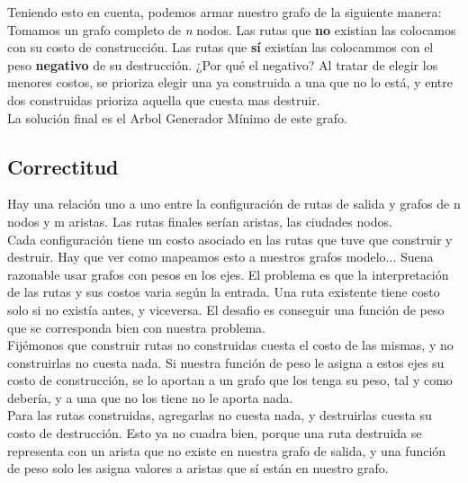 Teniendo esto en cuenta, podemos armar nuestro grafo de la siguiente manera: \\

Tomamos un grafo completo de \textit{n} nodos. Las rutas que \textbf{no} existian las colocamos con su costo de construcción. Las rutas que \textbf{sí} existían las colocammos con el peso \textbf{negativo} de su destrucción. ¿Por qué el negativo? Al tratar de elegir los menores costos, se prioriza elegir una ya construida a una que no lo está, y entre dos construidas prioriza aquella que cuesta mas destruir. \\

La solución final es el Arbol Generador Mínimo de este grafo. \\



\subsection{Correctitud}

Hay una relación uno a uno entre la configuración de rutas de salida y grafos de n nodos y m aristas. Las rutas finales serían aristas, las ciudades nodos. \\

Cada configuración tiene un costo asociado en las rutas que tuve que construir y destruir. Hay que ver como mapeamos esto a nuestros grafos modelo... Suena razonable usar grafos con pesos en los ejes. El problema es que la interpretación de las rutas y sus costos varia según la entrada. Una ruta existente tiene costo solo si no existía antes, y viceversa. El desafio es conseguir una función de peso que se corresponda bien con nuestra problema. \\

Fijémonos que construir rutas no construidas cuesta el costo de las mismas, y no construirlas no cuesta nada. Si nuestra función de peso le asigna a estos ejes su costo de construcción, se lo aportan a un grafo que los tenga su peso, tal y como debería, y a una que no los tiene no le aporta nada. \\

Para las rutas construidas, agregarlas no cuesta nada, y destruirlas cuesta su costo de destrucción. Esto ya no cuadra bien, porque una ruta destruida se representa con un arista que no existe en nuestra grafo de salida, y una función de peso solo les asigna valores a aristas que sí están en nuestro grafo. \\

